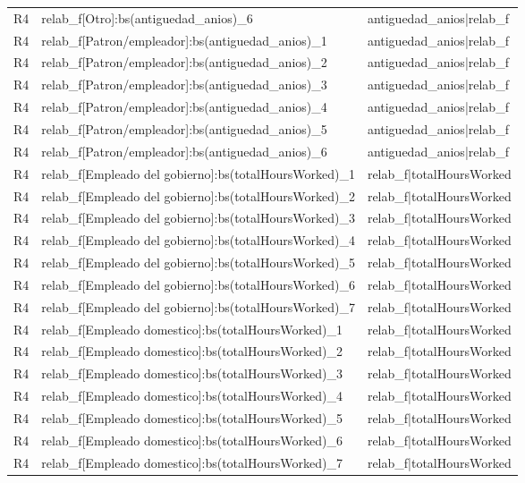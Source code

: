 \begin{longtable}{lll}
R4 & relab\_f[Otro]:bs(antiguedad\_anios)\_6 & antiguedad\_anios|relab\_f \\
R4 & relab\_f[Patron/empleador]:bs(antiguedad\_anios)\_1 & antiguedad\_anios|relab\_f \\
R4 & relab\_f[Patron/empleador]:bs(antiguedad\_anios)\_2 & antiguedad\_anios|relab\_f \\
R4 & relab\_f[Patron/empleador]:bs(antiguedad\_anios)\_3 & antiguedad\_anios|relab\_f \\
R4 & relab\_f[Patron/empleador]:bs(antiguedad\_anios)\_4 & antiguedad\_anios|relab\_f \\
R4 & relab\_f[Patron/empleador]:bs(antiguedad\_anios)\_5 & antiguedad\_anios|relab\_f \\
R4 & relab\_f[Patron/empleador]:bs(antiguedad\_anios)\_6 & antiguedad\_anios|relab\_f \\
R4 & relab\_f[Empleado del gobierno]:bs(totalHoursWorked)\_1 & relab\_f|totalHoursWorked \\
R4 & relab\_f[Empleado del gobierno]:bs(totalHoursWorked)\_2 & relab\_f|totalHoursWorked \\
R4 & relab\_f[Empleado del gobierno]:bs(totalHoursWorked)\_3 & relab\_f|totalHoursWorked \\
R4 & relab\_f[Empleado del gobierno]:bs(totalHoursWorked)\_4 & relab\_f|totalHoursWorked \\
R4 & relab\_f[Empleado del gobierno]:bs(totalHoursWorked)\_5 & relab\_f|totalHoursWorked \\
R4 & relab\_f[Empleado del gobierno]:bs(totalHoursWorked)\_6 & relab\_f|totalHoursWorked \\
R4 & relab\_f[Empleado del gobierno]:bs(totalHoursWorked)\_7 & relab\_f|totalHoursWorked \\
R4 & relab\_f[Empleado domestico]:bs(totalHoursWorked)\_1 & relab\_f|totalHoursWorked \\
R4 & relab\_f[Empleado domestico]:bs(totalHoursWorked)\_2 & relab\_f|totalHoursWorked \\
R4 & relab\_f[Empleado domestico]:bs(totalHoursWorked)\_3 & relab\_f|totalHoursWorked \\
R4 & relab\_f[Empleado domestico]:bs(totalHoursWorked)\_4 & relab\_f|totalHoursWorked \\
R4 & relab\_f[Empleado domestico]:bs(totalHoursWorked)\_5 & relab\_f|totalHoursWorked \\
R4 & relab\_f[Empleado domestico]:bs(totalHoursWorked)\_6 & relab\_f|totalHoursWorked \\
R4 & relab\_f[Empleado domestico]:bs(totalHoursWorked)\_7 & relab\_f|totalHoursWorked \\

\end{longtable}
